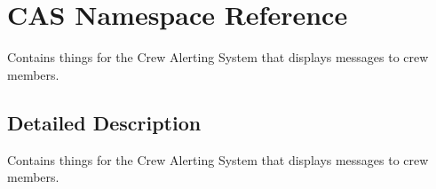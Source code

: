 \hypertarget{namespace_c_a_s}{\section{C\-A\-S Namespace Reference}
\label{namespace_c_a_s}
}


Contains things for the Crew Alerting System that displays messages to crew members.  




\subsection{Detailed Description}
Contains things for the Crew Alerting System that displays messages to crew members. 
